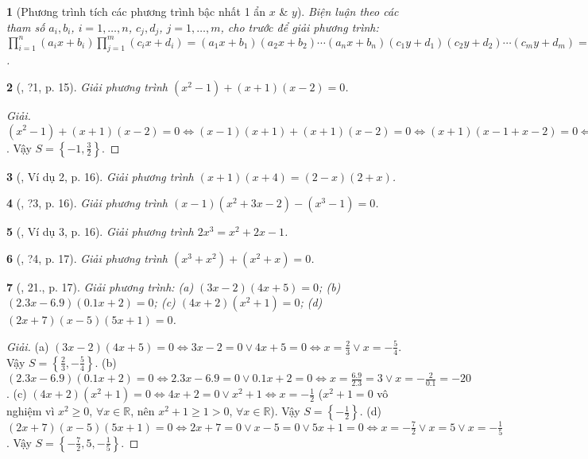 \documentclass{article}
\newtheorem{baitoan}{}
\begin{document}
\begin{baitoan}[Phương trình tích các phương trình bậc nhất 1 ẩn $x$ \& $y$]
	Biện luận theo các tham số $a_i,b_i$, $i = 1,\ldots,n$, $c_j,d_j$, $j = 1,\ldots,m$, cho trước để giải phương trình: $\prod_{i=1}^n (a_ix + b_i)\prod_{j=1}^m (c_ix + d_i) = (a_1x + b_1)(a_2x + b_2)\cdots(a_nx + b_n)(c_1y + d_1)(c_2y + d_2)\cdots(c_my + d_m) = 0$.
\end{baitoan}

\begin{baitoan}[\cite{SGK_Toan_8_tap_2}, ?1, p. 15]
	Giải phương trình $(x^2 - 1) + (x + 1)(x - 2) = 0$.
\end{baitoan}

\begin{proof}[Giải]
	$(x^2 - 1) + (x + 1)(x - 2) = 0\Leftrightarrow(x - 1)(x + 1) + (x + 1)(x - 2) = 0\Leftrightarrow(x + 1)(x - 1 + x - 2) = 0\Leftrightarrow(x + 1)(2x - 3) = 0\Leftrightarrow x = -1\lor x = \frac{3}{2}$. Vậy $S = \left\{-1,\frac{3}{2}\right\}$.
\end{proof}

\begin{baitoan}[\cite{SGK_Toan_8_tap_2}, Ví dụ 2, p. 16]
	Giải phương trình $(x + 1)(x + 4) = (2 - x)(2 + x)$.
\end{baitoan}

\begin{baitoan}[\cite{SGK_Toan_8_tap_2}, ?3, p. 16]
	Giải phương trình $(x - 1)(x^2 + 3x - 2) - (x^3 - 1) = 0$.
\end{baitoan}

\begin{baitoan}[\cite{SGK_Toan_8_tap_2}, Ví dụ 3, p. 16]
	Giải phương trình $2x^3 = x^2 + 2x - 1$.
\end{baitoan}

\begin{baitoan}[\cite{SGK_Toan_8_tap_2}, ?4, p. 17]
	Giải phương trình $(x^3 + x^2) + (x^2 + x) = 0$.
\end{baitoan}

\begin{baitoan}[\cite{SGK_Toan_8_tap_2}, 21., p. 17]
	Giải phương trình: (a) $(3x - 2)(4x + 5) = 0$; (b) $(2.3x - 6.9)(0.1x + 2) = 0$; (c) $(4x + 2)(x^2 + 1) = 0$; (d) $(2x + 7)(x - 5)(5x + 1) = 0$.
\end{baitoan}

\begin{proof}[Giải]
	(a) $(3x - 2)(4x + 5) = 0\Leftrightarrow3x - 2 = 0\lor4x + 5 = 0\Leftrightarrow x = \frac{2}{3}\lor x = -\frac{5}{4}$. Vậy $S = \left\{\frac{2}{3},-\frac{5}{4}\right\}$. (b) $(2.3x - 6.9)(0.1x + 2) = 0\Leftrightarrow 2.3x - 6.9 = 0\lor0.1x + 2 = 0\Leftrightarrow x = \frac{6.9}{2.3} = 3\lor x = -\frac{2}{0.1} = -20$. (c) $(4x + 2)(x^2 + 1) = 0\Leftrightarrow4x + 2 = 0\lor x^2 + 1\Leftrightarrow x = -\frac{1}{2}$ ($x^2 + 1 = 0$ vô nghiệm vì $x^2\ge0$, $\forall x\in\mathbb{R}$, nên $x^2 + 1\ge1 > 0$, $\forall x\in\mathbb{R}$). Vậy $S = \left\{-\frac{1}{2}\right\}$. (d) $(2x + 7)(x - 5)(5x + 1) = 0\Leftrightarrow2x + 7 = 0\lor x - 5 = 0\lor5x + 1 = 0\Leftrightarrow x = -\frac{7}{2}\lor x = 5\lor x = -\frac{1}{5}$. Vậy $S = \left\{-\frac{7}{2},5,-\frac{1}{5}\right\}$.
\end{proof}
\end{document}
